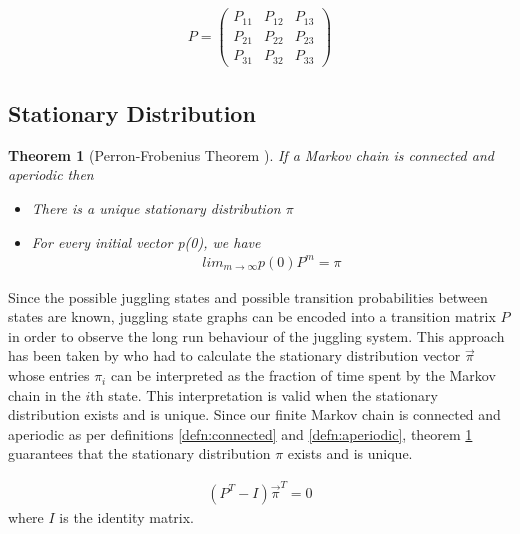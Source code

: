 \documentclass{article}
\newtheorem{theorem}{Theorem}[section]
\theoremstyle{definition}
\theoremstyle{remark}
\numberwithin{equation}{section}
\begin{document}
\begin{align}
    \label{eqn:trans_mat} P =
                        \begin{pmatrix}
                        P_{11} & P_{12} & P_{13} \\
                        P_{21} & P_{22} & P_{23} \\
                        P_{31} & P_{32} & P_{33}
                        \end{pmatrix}
\end{align}



\subsection{Stationary Distribution} \label{sec:st_dist}

\begin{theorem}[Perron-Frobenius Theorem {\cite[p.28]{PSAllNotes}}] 
\label{thm:perr} If a Markov chain is connected and aperiodic then 
\begin{itemize}
    \item There is a unique stationary distribution $\pi$
    \item For every initial vector p(0), we have 
    \begin{align}
        lim_{m \rightarrow \infty} p(0) P^m = \pi
    \end{align}  
\end{itemize}
    
\end{theorem}

Since the possible juggling states and possible transition probabilities between states are known, juggling state graphs can be encoded into a transition matrix $P$ in order to observe the long run behaviour of the juggling system. This approach has been taken by \cite[p.110]{Warrington2005} who had to calculate the stationary distribution vector $\vec{\pi}$ whose entries $\pi_i$ can be interpreted as the fraction of time spent by the Markov chain in the $i$th state. This interpretation is valid when the stationary distribution exists and is unique. Since our finite Markov chain is connected and aperiodic as per definitions \ref{defn:connected} and \ref{defn:aperiodic}, theorem \ref{thm:perr} guarantees that the stationary distribution $\pi$ exists and is unique.

\begin{align}
    \label{eqn:st_eqn} (P^T - I)\vec{\pi}^T = 0   
\end{align}
where $I$ is the identity matrix. 
\end{document}
